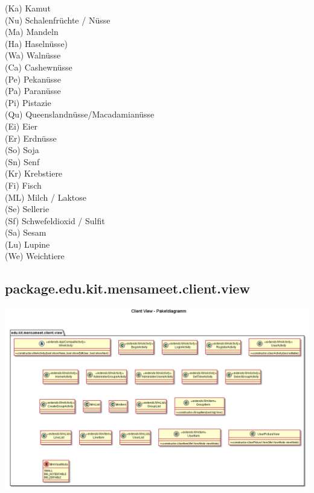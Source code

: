 \documentclass[a4paper]{scrreprt}
\begin{document}
{(Ka) Kamut \\
(Nu) Schalenfrüchte / Nüsse \\
(Ma) Mandeln \\
(Ha) Haselnüsse) \\ 
(Wa) Walnüsse \\
(Ca) Cashewnüsse \\
(Pe) Pekanüsse \\
(Pa) Paranüsse \\
(Pi) Pistazie \\
(Qu) Queenslandnüsse/Macadamianüsse \\
(Ei) Eier \\
(Er) Erdnüsse \\
(So) Soja \\
(Sn) Senf \\
(Kr) Krebstiere \\
(Fi) Fisch \\
(ML) Milch / Laktose \\
(Se) Sellerie \\
(Sf) Schwefeldioxid / Sulfit \\
(Sa) Sesam \\
(Lu) Lupine \\
(We) Weichtiere \\}
  


\newpage
\subsection{package.edu.kit.mensameet.client.view}

\begin{center}
	\includegraphics[width=1.1\textwidth]{GUI/frontend-package-view.png}
\end{center} 
\end{document}
